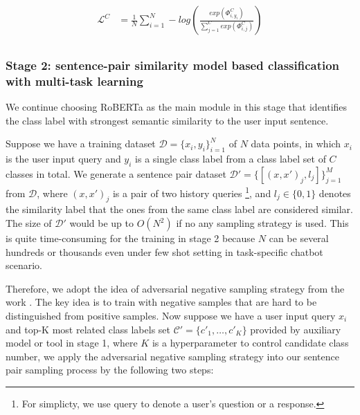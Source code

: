 \documentclass[letterpaper]{article} %
\begin{document}
  \begin{equation}
    \begin{aligned}
      \mathcal{L}^{C}&=\frac{1}{N}\sum_{i=1}^{N}-log(\frac{exp(\varPhi_{i,y_{i}}^C)}{\sum_{j=1}^{C}exp(\varPhi_{i,j}^C)}) \\
      \label{eq:classification_loss}
    \end{aligned}
  \end{equation}

  \subsubsection*{
    Stage 2: sentence-pair similarity model based classification with multi-task
    learning
  }
  We  continue choosing RoBERTa as the main module in this stage that identifies
  the class label with strongest semantic similarity to the user input sentence.

  Suppose  we have a training dataset $\mathcal{D}=\{x_{i},y_{i}\}_{i=1}^{N}$ of
  $N$  data  points,  in  which $x_{i}$ is the user input query and $y_{i}$ is a
  single  class label from a class label set of $C$ classes in total. We 
  generate            a sentence            pair            dataset
  $\mathcal{D'}=\{[(x,x')_{j},l_{j}]\}_{j=1}^{M}$ from $\mathcal{D}$,   where   $(x,   x')_{j}$  is
  a pair of two history queries \footnote{For simplicty, we use query
  to denote a user's question or a response.}, and $l_{j}\in\{0, 1\}$ denotes the
  similarity label that the ones from the same class label are considered
  similar. The size of $\mathcal{D'}$  would be up to $O(N^2)$ if no any
  sampling strategy is used.  This is quite time-consuming  for the  training
  in stage 2 because $N$ can be several hundreds or thousands even under 
  few shot setting in task-specific chatbot scenario. 

  Therefore,  we  adopt  the idea of adversarial negative sampling strategy from
  the  work  \cite{bamler2020extreme}.  The  key  idea is to train with negative
  samples  that  are hard to be distinguished from positive samples. Now suppose
  we  have  a  user  input query $x_{i}$ and top-K most related class labels set
  $\mathcal{C'}=\{c'_{1},  \dots,  c'_{K}\}$ provided by auxiliary model or tool
  in  stage  1, where $K$ is a hyperparameter to control candidate class number,
  we  apply  the  adversarial  negative sampling strategy into our sentence pair
  sampling process by the following two steps:
\end{document}
